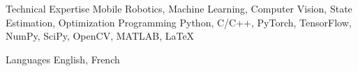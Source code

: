 

\begin{cvskills}

  \cvskill
    {Technical Expertise} %
    {Mobile Robotics, Machine Learning, Computer Vision, State Estimation, Optimization} %
  \cvskill
    {Programming} %
    {Python, C/C++, PyTorch, TensorFlow, NumPy, SciPy, OpenCV, MATLAB, LaTeX} %

  \cvskill
    {Languages} %
    {English, French} %

\end{cvskills}
